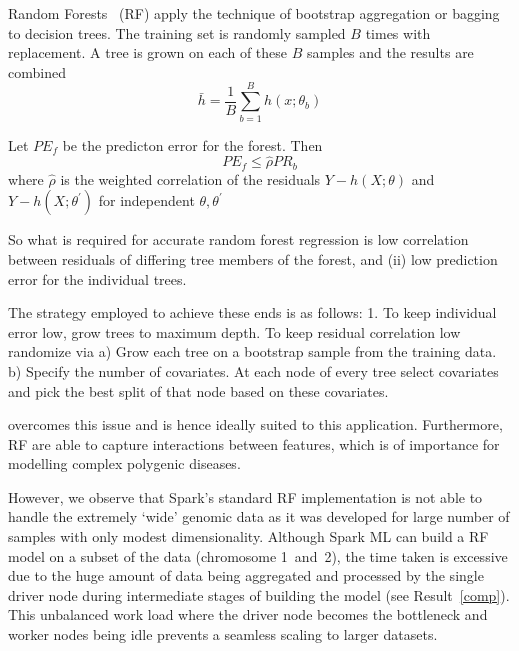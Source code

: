 \documentclass[10pt,letterpaper]{article}
\begin{document}
Random Forests~\cite{Breiman.2001} (RF) 
apply the technique of bootstrap aggregation or bagging to decision trees. The training set is randomly sampled $B$
times with replacement. A tree is grown on each of these $B$ samples and the results are combined
\begin{equation*}
{\bar {h}}={\frac {1}{B}}\sum _{b=1}^{B} h(x;\theta_b)
\end{equation*}

Let $PE_f$ be the predicton error for the forest. Then
\begin{equation*}
PE_f \leq \hat{\rho} PR_b
\end{equation*}
where $\hat{\rho}$ is the weighted correlation of the residuals $Y-  h(X;\theta)$ and $Y-  h(X;\theta^\prime)$
for independent $\theta,  \theta^\prime $

So what is required for  accurate random forest regression is low correlation between residuals of differing tree members of
the forest, and (ii) low prediction error for the individual trees. 

The strategy employed to achieve these ends is as follows:
1. To keep individual error low, grow trees to maximum depth.
To keep residual correlation low randomize via
a) Grow each tree on a bootstrap sample from the training data.
b) Specify the number of covariates. At each node of every tree
select covariates and pick the best split of that node based on these
covariates.\cite{Segal.2004}



overcomes this issue and is hence ideally suited to this application.  Furthermore, RF are able to capture interactions
between features, which is of importance for modelling complex polygenic diseases.



However, we observe that Spark's standard RF implementation is not able to handle the extremely `wide' genomic data as
it was developed for large number of samples with only modest dimensionality.  Although Spark ML can build a RF model on
a subset of the data (chromosome 1~and~2), the time taken is excessive due to the huge amount of data being aggregated
and processed by the single driver node during intermediate stages of building the model (see Result~\ref{comp}).  This
unbalanced work load where the driver node becomes the bottleneck and worker nodes being idle prevents a seamless
scaling to larger datasets.
\end{document}
